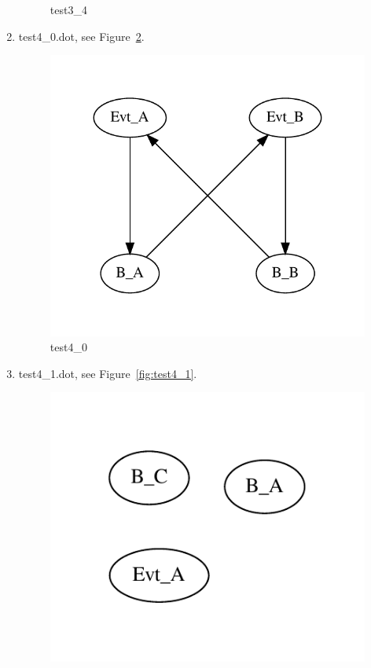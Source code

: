 \documentclass[12pt,a4paper]{report}
\begin{document}
\begin{enumerate}
\begin{figure}
        \caption{test3\_4}
        \label{fig:test3_4}
    \end{figure}
\item test4\_0.dot, see Figure~\ref{fig:test4_0}.
    \begin{figure}
        \centering 
        \includegraphics*[width=1.0\textwidth,keepaspectratio]{TestPattern/test4_0.pdf}
        \caption{test4\_0}
        \label{fig:test4_0}
    \end{figure}
\item test4\_1.dot, see Figure~\ref{fig:test4_1}.
    \begin{figure}
        \centering 
        \includegraphics*[width=1.0\textwidth,keepaspectratio]{TestPattern/test4_1.pdf}

\end{figure}
\end{enumerate}
\end{document}
